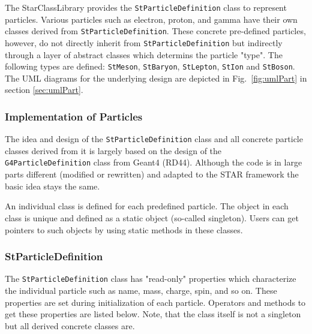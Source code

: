 \documentclass[twoside]{article}
\newcommand{\comp}[1]{\texttt{#1}}%
\begin{document}
The StarClassLibrary provides the \comp{StParticleDefinition} class to
represent particles. Various particles such as electron, proton, and
gamma have their own classes derived from \comp{StParticleDefinition}. 
These concrete pre-defined particles, however, do not directly inherit
from \comp{StParticleDefinition} but indirectly through a layer of abstract
classes which determins the particle "type".  The following types are defined:
\comp{StMeson}, \comp{StBaryon}, \comp{StLepton}, \comp{StIon} and \comp{StBoson}.
The UML diagrams for the underlying design are depicted in Fig.~\ref{fig:umlPart}
in section \ref{sec:umlPart}.

\subsubsection{Implementation of Particles}

The idea and design of the \comp{StParticleDefinition} class and all
concrete particle classes derived from it is largely based on the
design of the \comp{G4ParticleDefinition} class from Geant4
(RD44).  Although the code is in large parts different
(modified or rewritten) and adapted to the STAR framework the basic
idea stays the same.

An individual class is defined for each predefined particle. The
object in each class is unique and defined as a static object (so-called
singleton).  Users can get pointers to such objects by using static
methods in these classes.

\subsubsection{StParticleDefinition}

The \comp{StParticleDefinition} class has "read-only" properties which
characterize the individual particle such as name, mass, charge, spin, and
so on. These properties are set during initialization of each particle.
Operators and methods to get these properties are listed below. Note,
that the class itself is not a singleton but all derived concrete
classes are.
\end{document}
